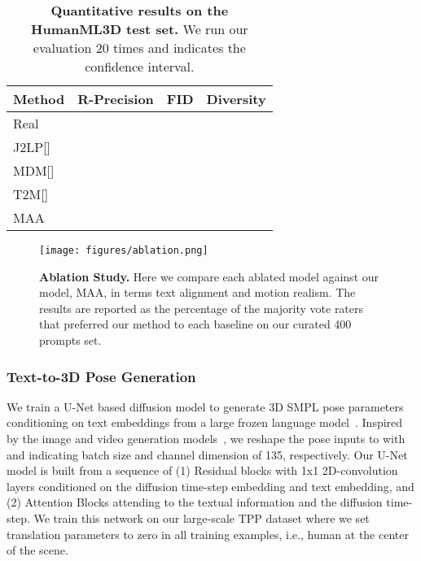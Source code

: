 \documentclass[10pt,twocolumn,letterpaper]{article}
\begin{document}
\begin{table}[t]
    \begin{center}
        \setlength{\tabcolsep}{2pt}
            \begin{tabular}{lccc}
                \toprule
                \textbf{Method} & 
                R-Precision  &
                FID  &
                Diversity  \\
                \midrule
                 Real &
                 &
                 &
                  \\
                 \midrule
                J2LP[\cite{ahuja2019jl2p}] &
                 &
                 &
                  \\

                 MDM[\cite{tevet2022mdm}] &
                 &
                 &
                  \\
                  T2M[\cite{guo2022t2m}] &
                 &
                 &
                  \\
                 \midrule
                MAA &
                 &
                 &
                  \\

                \bottomrule
            \end{tabular}
    \caption{\textbf{ Quantitative results on the HumanML3D test set.} We run our evaluation 20 times and  indicates the 
confidence interval.}
    \vspace{-2em}
    \label{tab:auto}
    \end{center}
\end{table}
 
\begin{figure}
  \centering \texttt{[image: figures/ablation.png]}
  \caption{\textbf{Ablation Study.} Here we compare each ablated model against our model, MAA, in terms text alignment and motion realism.
The results are reported as the percentage of the majority vote raters that
preferred our method to each baseline on our curated 400 prompts set.}
  \label{fig:ablation}
\end{figure}



\subsubsection{Text-to-3D Pose Generation}
We train a U-Net based diffusion model to generate 3D SMPL pose parameters conditioning on text embeddings from a large frozen language model~\cite{t5_2020}. Inspired by the image and video generation models~\cite{MAV}, we reshape the pose inputs to  with  and  indicating batch size and channel dimension of 135, respectively. Our U-Net model is built from a sequence of (1) Residual blocks with 1x1 2D-convolution layers conditioned on the diffusion time-step embedding and text embedding, and (2) Attention Blocks attending to the textual information and the diffusion time-step.
We train this network on our large-scale TPP dataset where we set translation parameters to zero in all training examples, i.e., human at the center of the scene. 
\end{document}
